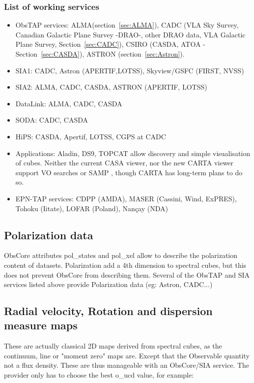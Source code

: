 \documentclass[11pt,a4paper]{ivoa}
\begin{document}
\subsubsection{List of working services}
\begin{itemize}
\item ObsTAP services: ALMA(section~\ref{sec:ALMA}), CADC (VLA Sky Survey, Canadian Galactic Plane 
Survey -DRAO-, other DRAO data, VLA Galactic Plane Survey, Section~\ref{sec:CADC}), CSIRO (CASDA, ATOA - 
Section~\ref{sec:CASDA}), ASTRON (section~\ref{sec:Astron}).
\item SIA1: CADC, Astron (APERTIF,LOTSS), Skyview/GSFC (FIRST, NVSS)
\item SIA2: ALMA, CADC, CASDA, ASTRON (APERTIF, LOTSS)
\item DataLink: ALMA, CADC, CASDA
\item SODA: CADC, CASDA
\item HiPS: CASDA, Apertif, LOTSS, CGPS at CADC
\item Applications: Aladin, DS9, TOPCAT allow discovery and simple visualisation of cubes. Neither the 
current CASA viewer, nor the new CARTA viewer support VO searches or SAMP \citep{2009ivoa.spec.0421B}, 
though CARTA has long-term plans to do so.
\item EPN-TAP services: CDPP (AMDA), MASER (Cassini, Wind, ExPRES), Tohoku (Iitate), LOFAR (Poland), 
Nan\c cay (NDA)
\end{itemize}


\subsection{Polarization data}
ObsCore attributes pol\_states and pol\_xel allow to describe the polarization content of datasets. 
Polarization add a 4th dimension to spectral cubes, but this does not prevent ObsCore from describing 
them. Several of the ObsTAP and SIA services listed above provide Polarization data (eg: Astron, 
CADC...)


\subsection{Radial velocity, Rotation and dispersion measure maps}
These are actually classical 2D maps derived from spectral cubes, as the continuum, line or "moment 
zero" maps are. Except that the Observable quantity not a flux density. These are thus manageable with 
an ObsCore/SIA service. The provider only has to choose the best o\_ucd value, for example:
\end{document}
